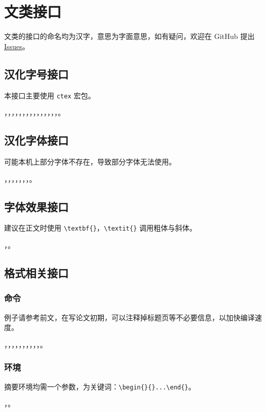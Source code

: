 \section{文类接口}
文类的接口的命名均为汉字，意思为字面意思，如有疑问，欢迎在 GitHub 提出 \href{https://github.com/Iydon/sustechthesis/issues}{Issues}。

\subsection{汉化字号接口}
本接口主要使用 \texttt{ctex} 宏包。

，，，，，，，，，，，，，，，。


\subsection{汉化字体接口}
可能本机上部分字体不存在，导致部分字体无法使用。

，，，，，，，。


\subsection{字体效果接口}
建议在正文时使用 \verb|\textbf{}|，\verb|\textit{}| 调用粗体与斜体。

，。


\subsection{格式相关接口}
\subsubsection{命令}
例子请参考前文，在写论文初期，可以注释掉标题页等不必要信息，以加快编译速度。

，，，，，，，，，，。

\subsubsection{环境}
摘要环境均需一个参数，为关键词：\verb|\begin{}{}...\end{}|。

，。
